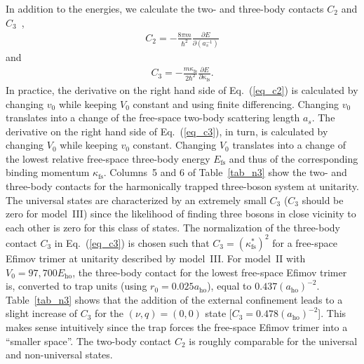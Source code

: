 \documentclass[aps,pra,twocolumn,showpacs,superscriptaddress]{revtex4}
\begin{document}
In addition to the energies, we calculate the two- and three-body
contacts $C_2$ and $C_3$~\cite{smith2014},
\begin{eqnarray}
\label{eq_c2}
C_2 = - \frac{8 \pi m}{\hbar^2}  \frac{\partial E}{\partial(a_s^{-1})}
\end{eqnarray}
and
\begin{eqnarray}
\label{eq_c3}
C_3 = -\frac{m \kappa_{\text{fs}}}{2 \hbar^2 } 
\frac{\partial E}{\partial \kappa_{\text{fs}}}.
\end{eqnarray} 
In practice, 
the derivative on the right hand side of Eq.~(\ref{eq_c2})
is calculated by changing $v_0$ while keeping $V_0$ constant
and using finite differencing.
Changing $v_0$ translates into
a change of the free-space two-body scattering length $a_s$.
The derivative on the right hand side of Eq.~(\ref{eq_c3}),
in turn,
is calculated by changing $V_0$ while keeping $v_0$ constant.
Changing $V_0$ translates into
a change of the lowest relative free-space three-body 
energy $E_{\text{fs}}$ and thus of the corresponding
binding momentum $\kappa_{\text{fs}}$.
Columns~5 and 6 of Table~\ref{tab_n3} show the
two- and three-body contacts for the harmonically trapped
three-boson system at unitarity.
The universal states are characterized by an extremely
small $C_3$ ($C_3$ should be zero for model~III) since
the likelihood of finding three bosons in close vicinity
to each other is zero
for this class of states. 
The normalization of the three-body contact $C_3$ 
in Eq.~(\ref{eq_c3}) is chosen such that
$C_3=(\kappa^*_{\text{fs}})^2$ for a free-space Efimov trimer
at unitarity
described by model~III. 
For model~II with $V_0=97,700 E_{\text{ho}}$,
the three-body contact for the lowest 
free-space Efimov trimer is, converted to
trap units (using $r_0=0.025a_{\text{ho}}$),
equal to $0.437 (a_{\text{ho}})^{-2}$.
Table~\ref{tab_n3} shows that
the addition of the external confinement leads to a
slight increase
of $C_3$ for the $(\nu,q)=(0,0)$ state
[$C_3=0.478 (a_{\text{ho}})^{-2}$]. 
This makes sense 
intuitively since 
the trap forces the free-space Efimov trimer
into a ``smaller space''.
The two-body contact $C_2$ is roughly comparable
for the universal and non-universal states.
\end{document}
